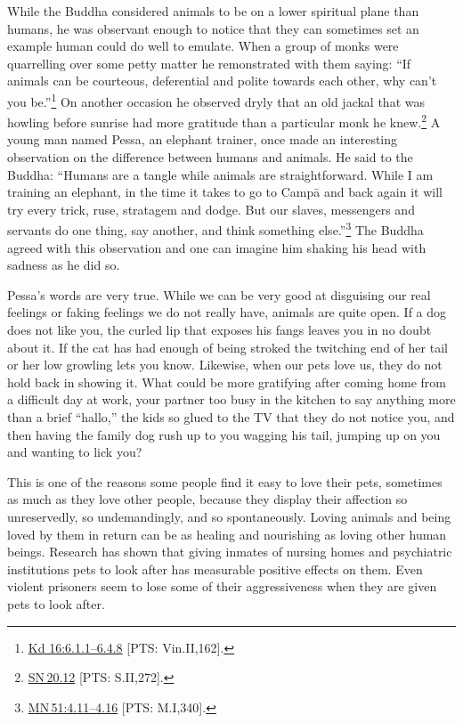 \documentclass[10pt, openright]{book}
\begin{document}
While the Buddha considered animals to be on a lower spiritual plane than humans, he was observant enough to notice that they can sometimes set an example human could do well to emulate. When a group of monks were quarrelling over some petty matter he remonstrated with them saying: “If animals can be courteous, deferential and polite towards each other, why can’t you be.”\footnote {\href{https://suttacentral.net/pli-tv-kd16/en/brahmali#6.1.1}{Kd 16:6.1.1–6.4.8} [PTS: Vin.II,162].} On another occasion he observed dryly that an old jackal that was howling before sunrise had more gratitude than a particular monk he knew.\footnote {\href{https://suttacentral.net/sn20.12/en/sujato}{SN 20.12} [PTS: S.II,272].} A young man named Pessa, an elephant trainer, once made an interesting observation on the difference between humans and animals. He said to the Buddha: “Humans are a tangle while animals are straightforward. While I am training an elephant, in the time it takes to go to Campā and back again it will try every trick, ruse, stratagem and dodge. But our slaves, messengers and servants do one thing, say another, and think something else.”\footnote {\href{https://suttacentral.net/mn51/en/sujato\#4.11}{MN 51:4.11–4.16} [PTS: M.I,340].} The Buddha agreed with this observation and one can imagine him shaking his head with sadness as he did so.


Pessa’s words are very true. While we can be very good at disguising our real feelings or faking feelings we do not really have, animals are quite open. If a dog does not like you, the curled lip that exposes his fangs leaves you in no doubt about it. If the cat has had enough of being stroked the twitching end of her tail or her low growling lets you know. Likewise, when our pets love us, they do not hold back in showing it. What could be more gratifying after coming home from a difficult day at work, your partner too busy in the kitchen to say anything more than a brief “hallo,” the kids so glued to the TV that they do not notice you, and then having the family dog rush up to you wagging his tail, jumping up on you and wanting to lick you?


This is one of the reasons some people find it easy to love their pets, sometimes as much as they love other people, because they display their affection so unreservedly, so undemandingly, and so spontaneously. Loving animals and being loved by them in return can be as healing and nourishing as loving other human beings. Research has shown that giving inmates of nursing homes and psychiatric institutions pets to look after has measurable positive effects on them. Even violent prisoners seem to lose some of their aggressiveness when they are given pets to look after.
\end{document}
